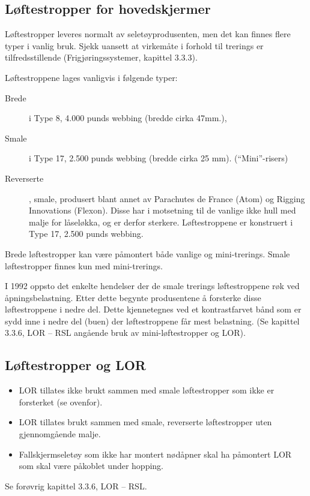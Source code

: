 \subsection{Løftestropper for hovedskjermer}
Løftestropper leveres normalt av seletøyprodusenten, men det kan finnes flere typer i vanlig bruk. Sjekk uansett at virkemåte i forhold til trerings er tilfredsstillende (Frigjøringssystemer, kapittel 3.3.3).

Løftestroppene lages vanligvis i følgende typer:
\begin{description}
\item[Brede] i Type 8, 4.000 punds webbing (bredde cirka 47mm.),
\item[Smale] i Type 17, 2.500 punds webbing (bredde cirka 25 mm). (``Mini''-risers)
\item[Reverserte], smale, produsert blant annet av Parachutes de France (Atom) og Rigging Innovations (Flexon). Disse har i motsetning til de vanlige ikke hull med malje for låseløkka, og er derfor sterkere. Løftestroppene er konstruert i Type 17, 2.500 punds webbing.
\end{description}

Brede løftestropper kan være påmontert både vanlige og mini-trerings. Smale løftestropper finnes kun med mini-trerings.

I 1992 oppsto det enkelte hendelser der de smale trerings løftestroppene røk ved åpningsbelastning. Etter dette begynte produsentene å forsterke disse løftestroppene i nedre del. Dette kjennetegnes ved et kontrastfarvet bånd som er sydd inne i nedre del (buen) der løftestroppene får mest belastning. (Se kapittel 3.3.6, LOR – RSL angående bruk av mini-løftestropper og LOR).

\subsection{Løftestropper og LOR}
\begin{itemize}
\item LOR tillates ikke brukt sammen med smale løftestropper som ikke er forsterket (se ovenfor).
\item LOR tillates brukt sammen med smale, reverserte løftestropper uten gjennomgående malje.
\item Fallskjermseletøy som ikke har montert nødåpner skal ha påmontert LOR som skal være påkoblet under hopping.
\end{itemize}

Se forøvrig kapittel 3.3.6, LOR – RSL.

